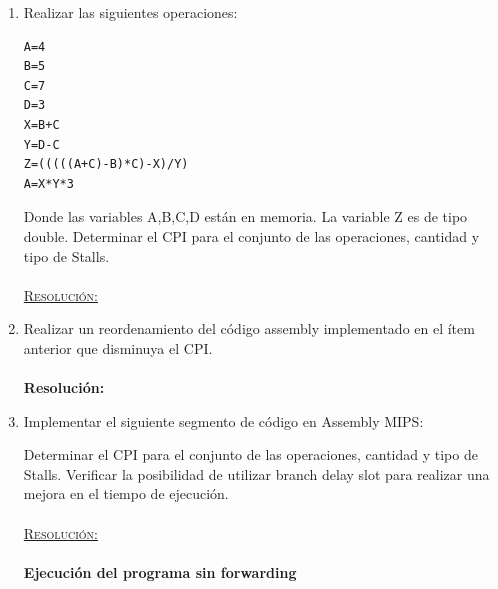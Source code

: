 \documentclass[a4paper,11pt]{article}
\begin{document}
\begin{enumerate}

\item  Realizar las siguientes operaciones:

\begin{center}
\begin{verbatim}
A=4
B=5
C=7
D=3
X=B+C
Y=D-C
Z=(((((A+C)-B)*C)-X)/Y)
A=X*Y*3
\end{verbatim}
\end{center}

Donde las variables A,B,C,D est\'an en memoria. La variable Z es de tipo double. Determinar el CPI para el conjunto de las operaciones, cantidad y tipo de Stalls.

\paragraph{}
\underline{\textsc{Resoluci\'on:}}

\newpage

\item	Realizar un reordenamiento del c\'odigo assembly implementado en el \'item anterior que disminuya el CPI.

\paragraph{}
\textbf{Resoluci\'on:}


\newpage
\item Implementar el siguiente segmento de c\'odigo en Assembly MIPS:


\lstset{language=c,basicstyle=\small,showstringspaces=false,columns=fullflexible,frame=lines,tabsize=4,inputencoding=latin1,extendedchars=true}


Determinar el CPI para el conjunto de las operaciones, cantidad y tipo de Stalls. Verificar la posibilidad de utilizar branch delay slot para realizar una mejora en el tiempo de ejecuci\'on.

\paragraph{}
\underline{\textsc{Resoluci\'on:}}


\paragraph{Ejecuci\'on del programa sin forwarding}



\end{enumerate}
\end{document}
